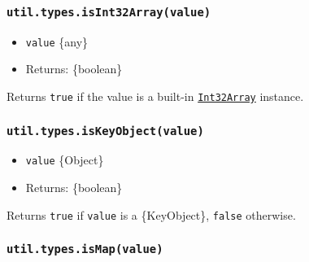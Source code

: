 \subsubsection{\texorpdfstring{\texttt{util.types.isInt32Array(value)}}{util.types.isInt32Array(value)}}\label{util.types.isint32arrayvalue}

\begin{itemize}
\tightlist
\item
  \texttt{value} \{any\}
\item
  Returns: \{boolean\}
\end{itemize}

Returns \texttt{true} if the value is a built-in
\href{https://developer.mozilla.org/en-US/docs/Web/JavaScript/Reference/Global_Objects/Int32Array}{\texttt{Int32Array}}
instance.

\begin{Shaded}
\begin{Highlighting}[]
\NormalTok{(} \NormalTok{())}\OperatorTok{;}  
\NormalTok{(} \NormalTok{())}\OperatorTok{;}  
\NormalTok{(} \NormalTok{())}\OperatorTok{;}  
\end{Highlighting}
\end{Shaded}

\subsubsection{\texorpdfstring{\texttt{util.types.isKeyObject(value)}}{util.types.isKeyObject(value)}}\label{util.types.iskeyobjectvalue}

\begin{itemize}
\tightlist
\item
  \texttt{value} \{Object\}
\item
  Returns: \{boolean\}
\end{itemize}

Returns \texttt{true} if \texttt{value} is a \{KeyObject\},
\texttt{false} otherwise.

\subsubsection{\texorpdfstring{\texttt{util.types.isMap(value)}}{util.types.isMap(value)}}\label{util.types.ismapvalue}

